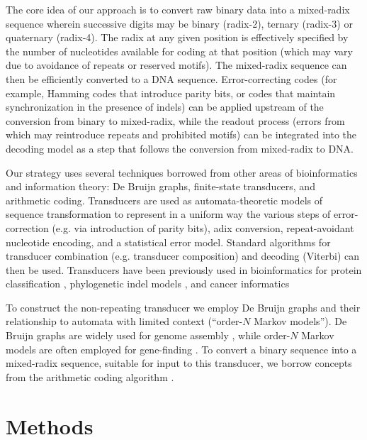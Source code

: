 \documentclass[english]{article}
\begin{document}
The core idea of our approach is to convert raw binary data into a mixed-radix sequence
wherein successive digits may be binary (radix-2), ternary (radix-3) or quaternary (radix-4).
The radix at any given position is effectively specified by the number of nucleotides available for coding at that position
(which may vary due to avoidance of repeats or reserved motifs).
The mixed-radix sequence can then be efficiently converted to a DNA sequence.
Error-correcting codes (for example, Hamming codes that introduce parity bits, or codes that maintain synchronization in the presence of indels)
can be applied upstream of the conversion from binary to mixed-radix,
while the readout process (errors from which may reintroduce repeats and prohibited motifs)
can be integrated into the decoding model as a step that follows the conversion from mixed-radix to DNA.

Our strategy uses several techniques borrowed from other areas of bioinformatics and information theory:
De Bruijn graphs, finite-state transducers, and arithmetic coding.
Transducers \cite{MohriPereiraRiley2000,WikipediaTransducers} are used as automata-theoretic models of sequence transformation
to represent in a uniform way the various steps of error-correction (e.g. via introduction of parity bits),
adix conversion, repeat-avoidant nucleotide encoding, and a statistical error model.
Standard algorithms for transducer combination (e.g. transducer composition)
and decoding (Viterbi) can then be used.
Transducers have been previously used in bioinformatics for
protein classification \cite{EskinEtAl2000},
phylogenetic indel models \cite{PatenEtAl2008,WestessonEtAlArxiv2012,WestessonEtAl2012},
and cancer informatics \cite{SchwarzEtAl2014}

To construct the non-repeating transducer
we employ De Bruijn graphs
and their relationship to automata with limited context (``order-$N$ Markov models'').
De Bruijn graphs are widely used for genome assembly \cite{DeBruijn1946,PevznerEtAl2001,ZerbinoBirney2008,IqbalEtAl2012},
while order-$N$ Markov models are often employed for gene-finding \cite{BurgeKarlin1997,SalzbergEtAl1999}.
To convert a binary sequence into a mixed-radix sequence, suitable for input to this transducer, we borrow concepts from the arithmetic coding algorithm \cite{Rissanen1976,Mackay2003}.

\section{Methods}
\end{document}
